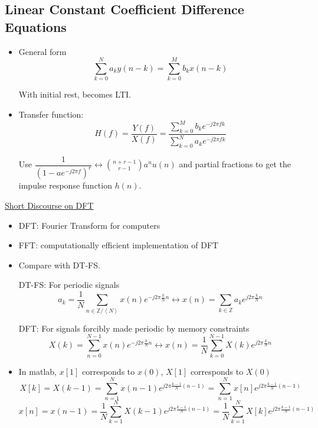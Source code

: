 \documentclass{article}
\begin{document}
\subsection{Linear Constant Coefficient Difference Equations}
\begin{itemize}
    \item General form
    \[\sum_{k=0}^{N}a_ky(n-k)=\sum_{k=0}^{M}b_kx(n-k)\]
    
    With initial rest, becomes LTI.
    \item Transfer function:
    \[H(f)=\frac{Y(f)}{X(f)}=\frac{\sum_{k=0}^{M}b_ke^{-j2\pi fk}}{\sum_{k=0}^{N}a_ke^{-j2\pi fk}}\]
    
    Use $\dfrac{1}{(1-ae^{-j2\pi f})^r}\leftrightarrow \displaystyle{n+r-1\choose r-1}a^nu(n)$ and partial fractions to get the impulse response function $h(n)$.
\end{itemize}
\underline{Short Discourse on DFT}
\begin{itemize}
    \item DFT: Fourier Transform for computers
    \item FFT: computationally efficient implementation of DFT
    \item Compare with DT-FS.
    
    DT-FS: For periodic signals \[a_k=\frac{1}{N}\sum_{n\in\mathbb{Z}/\left<N\right>}{x(n)e^{-j2\pi\frac{k}{N}n}}\leftrightarrow x(n)=\sum_{k\in\mathbb{Z}}{a_ke^{j2\pi\frac{k}{N}n}}\]
    
    DFT: For signals forcibly made periodic by memory constraints \[X(k)=\sum_{n=0}^{N-1}{x(n)e^{-j2\pi\frac{k}{N}n}}\leftrightarrow x(n)=\frac{1}{N}\sum_{k=0}^{N-1}{X(k)e^{j2\pi\frac{k}{N}n}}\]
    
    \item In matlab, $x[1]$ corresponds to $x(0)$, $X[1]$ corresponds to $X(0)$
    \[X[k]=X(k-1)=\sum_{n=1}^{N}{x(n-1)e^{j2\pi\frac{k-1}{N}(n-1)}}=\sum_{n=1}^{N}{x[n]e^{j2\pi\frac{k-1}{N}(n-1)}}\]
    \[x[n]=x(n-1)=\frac{1}{N}\sum_{k=1}^{N}{X(k-1)e^{j2\pi\frac{k-1}{N}(n-1)}}=\frac{1}{N}\sum_{k=1}^{N}{X[k]e^{j2\pi\frac{k-1}{N}(n-1)}}\]
\end{itemize}
\end{document}
